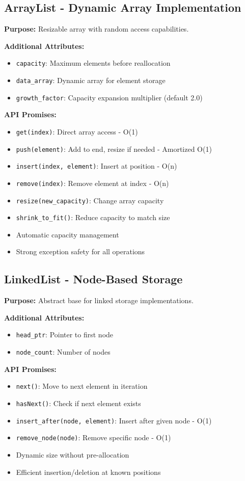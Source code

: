 \documentclass[12pt,a4paper]{article}
\begin{document}
\subsection{ArrayList - Dynamic Array Implementation}

\textbf{Purpose:} Resizable array with random access capabilities.

\textbf{Additional Attributes:}
\begin{itemize}
    \item \texttt{capacity}: Maximum elements before reallocation
    \item \texttt{data\_array}: Dynamic array for element storage
    \item \texttt{growth\_factor}: Capacity expansion multiplier (default 2.0)
\end{itemize}

\textbf{API Promises:}
\begin{itemize}
    \item \texttt{get(index)}: Direct array access - O(1)
    \item \texttt{push(element)}: Add to end, resize if needed - Amortized O(1)
    \item \texttt{insert(index, element)}: Insert at position - O(n)
    \item \texttt{remove(index)}: Remove element at index - O(n)
    \item \texttt{resize(new\_capacity)}: Change array capacity
    \item \texttt{shrink\_to\_fit()}: Reduce capacity to match size
    \item Automatic capacity management
    \item Strong exception safety for all operations
\end{itemize}

\subsection{LinkedList - Node-Based Storage}

\textbf{Purpose:} Abstract base for linked storage implementations.

\textbf{Additional Attributes:}
\begin{itemize}
    \item \texttt{head\_ptr}: Pointer to first node
    \item \texttt{node\_count}: Number of nodes
\end{itemize}

\textbf{API Promises:}
\begin{itemize}
    \item \texttt{next()}: Move to next element in iteration
    \item \texttt{hasNext()}: Check if next element exists
    \item \texttt{insert\_after(node, element)}: Insert after given node - O(1)
    \item \texttt{remove\_node(node)}: Remove specific node - O(1)
    \item Dynamic size without pre-allocation
    \item Efficient insertion/deletion at known positions
\end{itemize}
\end{document}
